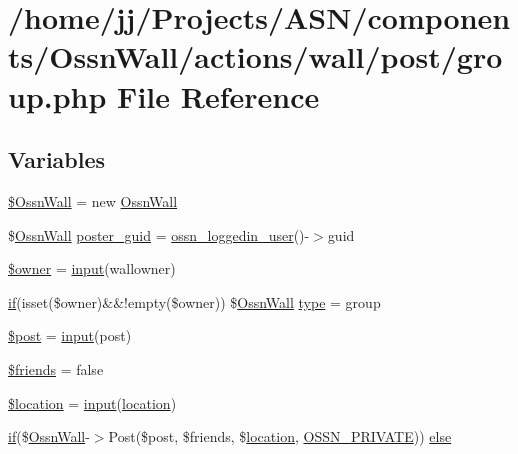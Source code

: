 \hypertarget{_ossn_wall_2actions_2wall_2post_2group_8php}{}\section{/home/jj/\+Projects/\+A\+S\+N/components/\+Ossn\+Wall/actions/wall/post/group.php File Reference}
\label{_ossn_wall_2actions_2wall_2post_2group_8php}
\subsection*{Variables}
\begin{DoxyCompactItemize}
\item 
\hyperlink{_ossn_wall_2actions_2wall_2post_2group_8php_a3fe8a689739786120fddd91dedeb172b}{\$\+Ossn\+Wall} = new \hyperlink{class_ossn_wall}{Ossn\+Wall}
\item 
\$\hyperlink{class_ossn_wall}{Ossn\+Wall} \hyperlink{_ossn_wall_2actions_2wall_2post_2group_8php_a24eb7b66e353d8983f6f2af979250671}{poster\+\_\+guid} = \hyperlink{ossn_8lib_8users_8php_aa3c8068d0e6638b414d6a2f6c62565b8}{ossn\+\_\+loggedin\+\_\+user}()-\/$>$guid
\item 
\hyperlink{_ossn_wall_2actions_2wall_2post_2group_8php_a9aabf46bdb166877480b2094d7ca01a7}{\$owner} = \hyperlink{ossn_8lib_8input_8php_a64ebee98b041c4f75f71ed3cd73cc8ed}{input}(\textquotesingle{}wallowner\textquotesingle{})
\item 
\hyperlink{jquery_8tokeninput_8js_ad8dd46a3cbc004569e34401e9e71771a}{if}(isset(\$owner)\&\&!empty(\$owner)) \$\hyperlink{class_ossn_wall}{Ossn\+Wall} \hyperlink{_ossn_wall_2actions_2wall_2post_2group_8php_a2dc1bb4e1ed0029daa81ac0776b14b51}{type} = \textquotesingle{}group\textquotesingle{}
\item 
\hyperlink{_ossn_wall_2actions_2wall_2post_2group_8php_a53d6c7669d97392c407c4f959a5263db}{\$post} = \hyperlink{ossn_8lib_8input_8php_a64ebee98b041c4f75f71ed3cd73cc8ed}{input}(\textquotesingle{}post\textquotesingle{})
\item 
\hyperlink{_ossn_wall_2actions_2wall_2post_2group_8php_afb66104a0d5a5b286634a265d216b8d6}{\$friends} = false
\item 
\hyperlink{_ossn_wall_2actions_2wall_2post_2group_8php_ac319193077976bb217112e5a7b7b8022}{\$location} = \hyperlink{ossn_8lib_8input_8php_a64ebee98b041c4f75f71ed3cd73cc8ed}{input}(\textquotesingle{}\hyperlink{_chart_8_doughnut_8js_a761c752fb16f7c0bfe1026b787ca0032}{location}\textquotesingle{})
\item 
\hyperlink{jquery_8tokeninput_8js_ad8dd46a3cbc004569e34401e9e71771a}{if}(\$\hyperlink{class_ossn_wall}{Ossn\+Wall}-\/$>$Post(\$post, \$friends, \$\hyperlink{_chart_8_doughnut_8js_a761c752fb16f7c0bfe1026b787ca0032}{location}, \hyperlink{ossn_8lib_8system_8php_a982684c5e83907832c9079348ec7edd3}{O\+S\+S\+N\+\_\+\+P\+R\+I\+V\+A\+TE})) \hyperlink{_ossn_wall_2actions_2wall_2post_2group_8php_ae7f30c1564dcb7344463fc71e818e572}{else}
\end{DoxyCompactItemize}


